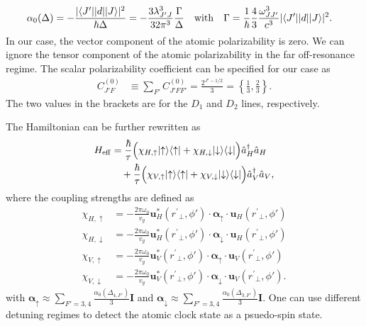\documentclass[preprint,aps,pra,onecolumn]{revtex4-1} %
\renewcommand{\tensor}[1]{\boldsymbol{#1}}
\begin{document}
\begin{align} \label{Eq::alpha0}
\alpha_0(\Delta) & =  -\frac{|  \langle{ J' }\rvert| d | \lvert{ J }\rangle |^2}{\hbar \Delta } = - \frac{3 \lambda_{J' J}^3}{32 \pi^3} \frac{ \Gamma }{ \Delta }\quad \text{with}\quad 
\Gamma = \frac{1}{\hbar} \frac{4}{3} \frac{\omega_{J J'}^3}{c^3} | \langle{ J' }\rvert| d | \lvert{ J }\rangle |^2.
\end{align}
In our case, the vector component of the atomic polarizability is zero. We can ignore the tensor component of the atomic polarizability in the far off-resonance regime. The scalar polarizability coefficient can be specified for our case as
\begin{align} \label{Eq::alpha0}
C_{J' F}^{(0)} &\equiv \sum_{F'} C_{J' F F'}^{(0)} =   \frac{2^{J'-1/2}}{3} =\left\{ \frac{1}{3},\frac{2}{3}\right\}.
\end{align}
The two values in the brackets are for the $D_1$ and $D_2$ lines, respectively.

The Hamiltonian can be further rewritten as
\begin{align}
H_{\rm eff} & = \frac{ \hbar }{ \tau}\Big( \chi_{H,\uparrow}\lvert{\uparrow}\rangle\langle{\uparrow}\rvert +  \chi_{H,\downarrow} \lvert{\downarrow}\rangle\langle{\downarrow}\rvert \Big) \hat{a}_H^\dagger \hat{a}_H \nonumber\\
&\quad +  \frac{ \hbar }{ \tau} \Big( \chi_{V,\uparrow}\lvert{\uparrow}\rangle\langle{\uparrow}\rvert +  \chi_{V,\downarrow} \lvert{\downarrow}\rangle\langle{\downarrow}\rvert \Big) \hat{a}_V^\dagger \hat{a}_V  ,
\end{align}
where the coupling strengths are defined as
\begin{align}
\chi_{H,\uparrow} &=  -\frac{2\pi\omega_0}{v_g} \mathbf{u}^*_{H}(r^\prime\!\!_\perp,\phi') \cdot\tensor{\alpha}_{\uparrow}\cdot \mathbf{u}_{H}(r^\prime\!\!_\perp,\phi') \\
\chi_{H,\downarrow} &=  -\frac{2\pi\omega_0}{v_g} \mathbf{u}^*_{H}(r^\prime\!\!_\perp,\phi') \cdot\tensor{\alpha}_{\downarrow}\cdot \mathbf{u}_{H}(r^\prime\!\!_\perp,\phi') \\
\chi_{V,\uparrow} &=  -\frac{2\pi\omega_0}{v_g}  \mathbf{u}^*_{V}(r^\prime\!\!_\perp,\phi') \cdot\tensor{\alpha}_{\uparrow}\cdot \mathbf{u}_{V}(r^\prime\!\!_\perp,\phi')  \\
\chi_{V,\downarrow} &=  -\frac{2\pi\omega_0}{v_g}  \mathbf{u}^*_{V}(r^\prime\!\!_\perp,\phi') \cdot\tensor{\alpha}_{\downarrow}\cdot \mathbf{u}_{V}(r^\prime\!\!_\perp,\phi'). 
\end{align}
with $\tensor{\alpha}_{\uparrow} \approx\sum_{F'=3,4}\frac{\alpha_0(\Delta_{4,F'})}{3}\mathbf{I}$
and $\tensor{\alpha}_{\downarrow} \approx\sum_{F'=3,4}\frac{\alpha_0(\Delta_{3,F'})}{3}\mathbf{I}$.
One can use different detuning regimes to detect the atomic clock state as a psuedo-spin state.
\end{document}
